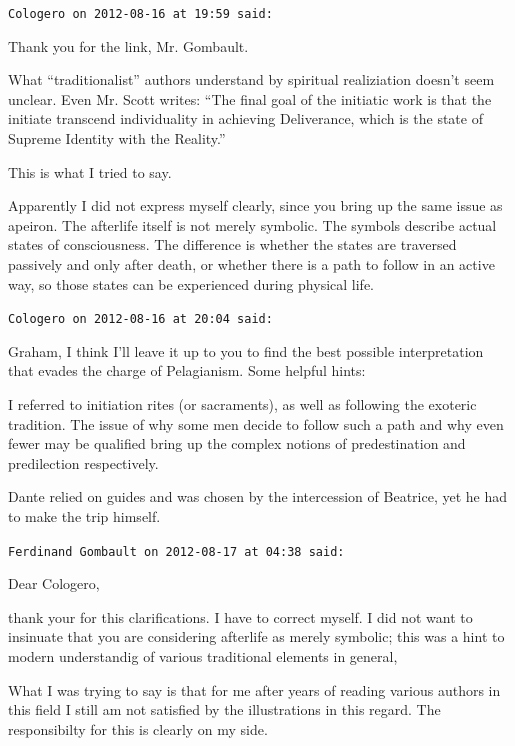 \begin{footnotesize}
\begin{sffamily}
\hfill

\texttt{Cologero on 2012-08-16 at 19:59 said:}

Thank you for the link, Mr. Gombault.

What ``traditionalist'' authors understand by spiritual realiziation doesn't seem unclear. Even Mr. Scott writes: ``The final goal of the initiatic work is that the initiate transcend individuality in achieving Deliverance, which is the state of Supreme Identity with the Reality.''

This is what I tried to say.

Apparently I did not express myself clearly, since you bring up the same issue as apeiron. The afterlife itself is not merely symbolic. The symbols describe actual states of consciousness. The difference is whether the states are traversed passively and only after death, or whether there is a path to follow in an active way, so those states can be experienced during physical life.

\hfill

\texttt{Cologero on 2012-08-16 at 20:04 said:}

Graham, I think I'll leave it up to you to find the best possible interpretation that evades the charge of Pelagianism. Some helpful hints:

I referred to initiation rites (or sacraments), as well as following the exoteric tradition. The issue of why some men decide to follow such a path and why even fewer may be qualified bring up the complex notions of predestination and predilection respectively.

Dante relied on guides and was chosen by the intercession of Beatrice, yet he had to make the trip himself.

\hfill

\texttt{Ferdinand Gombault on 2012-08-17 at 04:38 said:}

Dear Cologero,

thank your for this clarifications. I have to correct myself. I did not want to insinuate that you are considering afterlife as merely symbolic; this was a hint to modern understandig of various traditional elements in general,

What I was trying to say is that for me after years of reading various authors in this field I still am not satisfied by the illustrations in this regard. The responsibilty for this is clearly on my side.


\end{sffamily}
\end{footnotesize}
